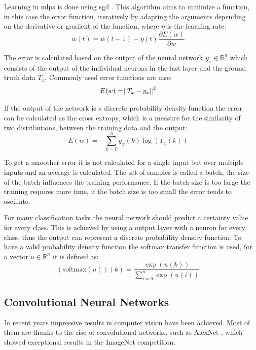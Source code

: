 Learning in \ac{mlp}s is done using \ac{sgd} \cite{robbins1951}.
This algorithm aims to minimize a function, in this case the error function, iteratively by adapting the arguments depending on the derivative or gradient of the function, where $\eta$ is the learning rate:
\begin{equation}
    w(t) = w(t-1) - \eta(t) \frac{\partial E(w)}{\partial w}
\end{equation}

The error is calculated based on the output of the neural network $y_x \in \mathbb{R}^n$ which consists of the output of the individual neurons in the last layer and the ground truth data $T_x$.
Commonly used error functions are \ac{mse}:
\begin{equation}
    E(w) = \norm{T_x - y_x}^2
\end{equation}

If the output of the network is a discrete probability density function the error can be calculated as the cross entropy, which is a measure for the similarity of two distributions, between the training data and the output:
\begin{equation}
    E(w) = - \sum_{k=0}^n y_x(k) \log(T_x(k))
\end{equation}

To get a smoother error it is not calculated for a single input but over multiple inputs and an average is calculated. 
The set of samples is called a batch, the size of the batch influences the training performance. 
If the batch size is too large the training requires more time, if the batch size is too small the error tends to oscillate.

For many classification tasks the neural network should predict a certainty value for every class.
This is achieved by using a output layer with a neuron for every class, thus the output can represent a discrete probability density function.
To have a valid probability density function the softmax transfer function is used, for a vector $u \in \mathbb{R}^n$ it is defined as:
\begin{equation}
    (\text{softmax}(u))(k) =  \frac{\exp(u(k))}{\sum_{i=0}^n \exp(u(i))}
\end{equation}

\subsection{Convolutional Neural Networks}
In recent years impressive results in computer vision have been achieved. 
Most of them are thanks to the rise of convolutional networks, such as AlexNet \cite{alexNet}, which showed exceptional results in the ImageNet \cite{imageNet} competition.


